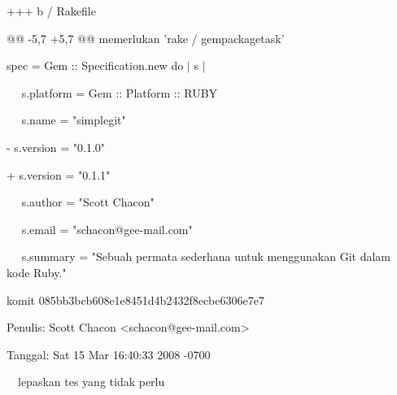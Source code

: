  \hspace*{0.5in} +++ b / Rakefile \par
\noindent 
 \hspace*{0.5in} @@ -5,7 +5,7 @@ memerlukan 'rake / gempackagetask' \par
\noindent 
 \hspace*{0.5in}  $  $spec = Gem :: Specification.new do  $  \vert  $ s  $  \vert  $ \par
\noindent 
 \hspace*{0.5in}  $  $ $  $ $  $ $  $ $  $s.platform = Gem :: Platform :: RUBY \par
\noindent 
 \hspace*{0.5in}  $  $ $  $ $  $ $  $ $  $s.name = "simplegit" \par
\noindent 
 \hspace*{0.5in} - s.version = "0.1.0" \par
\noindent 
 \hspace*{0.5in} + s.version = "0.1.1" \par
\noindent 
 \hspace*{0.5in}  $  $ $  $ $  $ $  $ $  $s.author = "Scott Chacon" \par
\noindent 
 \hspace*{0.5in}  $  $ $  $ $  $ $  $ $  $s.email = "schacon@gee-mail.com" \par
\noindent 
 \hspace*{0.5in}  $  $ $  $ $  $ $  $ $  $s.summary = "Sebuah permata sederhana untuk menggunakan Git dalam kode Ruby." \par
\vspace{12pt}
\noindent 
 \hspace*{0.5in} komit 085bb3bcb608e1e8451d4b2432f8ecbe6306e7e7 \par
\noindent 
 \hspace*{0.5in} Penulis: Scott Chacon <schacon@gee-mail.com> \par
\noindent 
 \hspace*{0.5in} Tanggal: Sat 15 Mar 16:40:33 2008 -0700 \par
\vspace{12pt}
\noindent 
 \hspace*{0.5in}  $  $ $  $ $  $ $  $lepaskan tes yang tidak perlu \par
\vspace{12pt}
\vspace{12pt}
\vspace{12pt}
\vspace{12pt}
\vspace{12pt}
